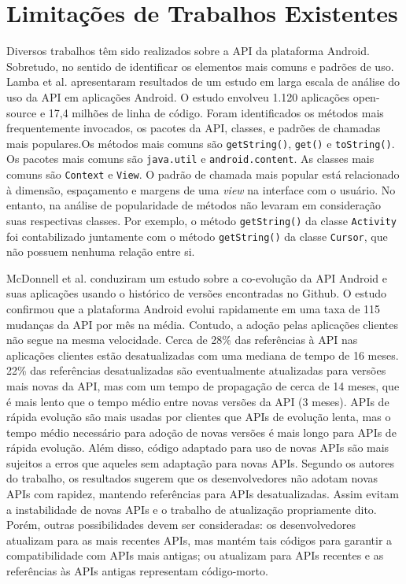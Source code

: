 \section{Limitações de Trabalhos Existentes} \label{sec:limitacao-abordagens-atuais}
Diversos trabalhos têm sido realizados sobre a API da plataforma Android. Sobretudo,
no sentido
de identificar os elementos mais comuns e padrões de uso. Lamba et al.\cite{Lamba2015} apresentaram
resultados de um estudo em larga escala de análise do uso da API em aplicações Android.
O estudo envolveu 1.120 aplicações open-source e 17,4 milhões de linha de código.
Foram identificados os métodos mais frequentemente invocados, os pacotes da API,
classes, e padrões de chamadas mais populares.Os métodos mais comuns são \texttt{getString()},
\texttt{get()} e \texttt{toString()}. Os pacotes mais comuns são \texttt{java.util} e
\texttt{android.content}. As classes mais comuns são \texttt{Context} e \texttt{View}.
O padrão de chamada mais popular está relacionado à dimensão, espaçamento e margens
de uma \textit{view} na interface com o usuário. No entanto, na análise de popularidade
de métodos não levaram em consideração suas respectivas classes. Por exemplo, o método
\texttt{getString()} da classe \texttt{Activity} foi contabilizado juntamente com
o método \texttt{getString()} da classe \texttt{Cursor}, que não possuem nenhuma
relação entre si.

McDonnell et al. \cite{McDonnell2013} conduziram um estudo sobre a co-evolução
da API Android e suas aplicações usando o histórico de versões encontradas no
Github. O estudo confirmou que a plataforma Android evolui rapidamente em uma
taxa de 115 mudanças da API por mês na média. Contudo, a adoção pelas aplicações
clientes não segue na mesma velocidade. Cerca de 28\% das referências à API nas
aplicações clientes estão desatualizadas com uma mediana de tempo de 16 meses.
22\% das referências desatualizadas são eventualmente atualizadas para versões
mais novas da API, mas com um tempo de propagação de cerca de 14 meses, que é mais
lento que o tempo médio entre novas versões da API (3 meses). APIs de rápida
evolução são mais usadas por clientes que APIs de evolução lenta, mas o tempo
médio necessário para adoção de novas versões é mais longo para APIs de rápida
evolução. Além disso, código adaptado para uso de novas APIs são mais sujeitos a
erros que aqueles sem adaptação para novas APIs. Segundo os autores do trabalho,
os resultados sugerem que os desenvolvedores não adotam novas APIs com rapidez,
mantendo referências para APIs desatualizadas. Assim evitam a instabilidade de
novas APIs e o trabalho de atualização propriamente dito. Porém, outras possibilidades
devem ser consideradas: os desenvolvedores atualizam para as mais recentes APIs,
mas mantém tais códigos para garantir a compatibilidade com APIs mais antigas;
ou atualizam para APIs recentes e as referências às APIs antigas representam
código-morto.

